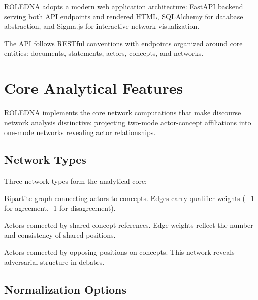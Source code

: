 \documentclass[../main.tex]{subfiles}
\begin{document}
ROLEDNA adopts a modern web application architecture: FastAPI backend serving both API endpoints and rendered HTML, SQLAlchemy for database abstraction, and Sigma.js for interactive network visualization.


The API follows RESTful conventions with endpoints organized around core entities: documents, statements, actors, concepts, and networks.


\section*{Core Analytical Features}

ROLEDNA implements the core network computations that make discourse network analysis distinctive: projecting two-mode actor-concept affiliations into one-mode networks revealing actor relationships.

\subsection*{Network Types}

Three network types form the analytical core:

\begin{description}[leftmargin=0.5cm, itemsep=0.3em]
\item[Two-Mode Affiliation Network] Bipartite graph connecting actors to concepts. Edges carry qualifier weights (+1 for agreement, -1 for disagreement).

\item[One-Mode Actor Congruence Network] Actors connected by shared concept references. Edge weights reflect the number and consistency of shared positions.

\item[One-Mode Actor Conflict Network] Actors connected by opposing positions on concepts. This network reveals adversarial structure in debates.
\end{description}

\subsection*{Normalization Options}
\end{document}
